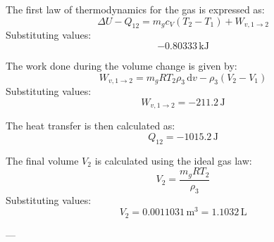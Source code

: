 The first law of thermodynamics for the gas is expressed as:  
\[
\Delta U - Q_{12} = m_g c_V (T_2 - T_1) + W_{v,1 \to 2}
\]  
Substituting values:  
\[
-0.80333 \, \text{kJ}
\]  

The work done during the volume change is given by:  
\[
W_{v,1 \to 2} = m_g R T_2 \rho_3 \, \text{d}v - \rho_3 (V_2 - V_1)
\]  
Substituting values:  
\[
W_{v,1 \to 2} = -211.2 \, \text{J}
\]  

The heat transfer is then calculated as:  
\[
Q_{12} = -1015.2 \, \text{J}
\]  

The final volume \( V_2 \) is calculated using the ideal gas law:  
\[
V_2 = \frac{m_g R T_2}{\rho_3}
\]  
Substituting values:  
\[
V_2 = 0.0011031 \, \text{m}^3 = 1.1032 \, \text{L}
\]  

---